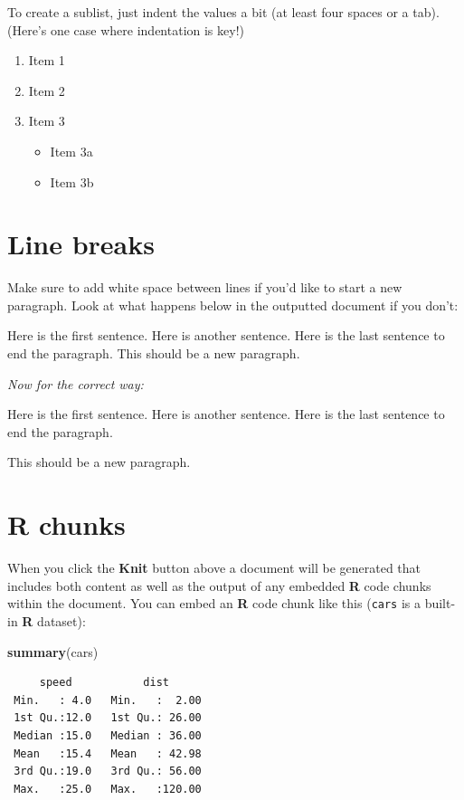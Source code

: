 \documentclass [11pt, proquest] {uwthesis}[2015/03/03]
\providecommand{\tightlist}{%
  \setlength{\itemsep}{0pt}\setlength{\parskip}{0pt}}
\newenvironment{Shaded}{}{}
\newcommand{\KeywordTok}[1]{\textcolor[rgb]{0.00,0.44,0.13}{\textbf{{#1}}}}
\newcommand{\NormalTok}[1]{{#1}}
\begin{document}
To create a sublist, just indent the values a bit (at least four spaces
or a tab). (Here's one case where indentation is key!)
\begin{enumerate}
\def\labelenumi{\arabic{enumi}.}
\tightlist
\item
  Item 1
\item
  Item 2
\item
  Item 3
  \begin{itemize}
  \tightlist
  \item
    Item 3a
  \item
    Item 3b
  \end{itemize}
\end{enumerate}
\section{Line breaks}\label{line-breaks}

Make sure to add white space between lines if you'd like to start a new
paragraph. Look at what happens below in the outputted document if you
don't:

Here is the first sentence. Here is another sentence. Here is the last
sentence to end the paragraph. This should be a new paragraph.

\emph{Now for the correct way:}

Here is the first sentence. Here is another sentence. Here is the last
sentence to end the paragraph.

This should be a new paragraph.

\section{R chunks}\label{r-chunks}

When you click the \textbf{Knit} button above a document will be
generated that includes both content as well as the output of any
embedded \textbf{R} code chunks within the document. You can embed an
\textbf{R} code chunk like this (\texttt{cars} is a built-in \textbf{R}
dataset):
\begin{Shaded}
\begin{Highlighting}[]
\KeywordTok{summary}\NormalTok{(cars)}
\end{Highlighting}
\end{Shaded}
\begin{verbatim}
     speed           dist       
 Min.   : 4.0   Min.   :  2.00  
 1st Qu.:12.0   1st Qu.: 26.00  
 Median :15.0   Median : 36.00  
 Mean   :15.4   Mean   : 42.98  
 3rd Qu.:19.0   3rd Qu.: 56.00  
 Max.   :25.0   Max.   :120.00  
\end{verbatim}
\end{document}
